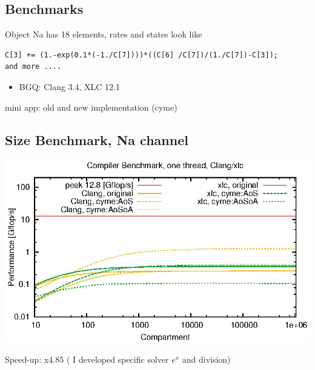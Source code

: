 \documentclass{beamer}
\begin{document}
\subsection*{Benchmarks}
\begin{frame}[fragile]
\centering
Object Na has 18 elements,  rates and states look like 
 \begin{lstlisting}[flexiblecolumns=true,basicstyle=\sffamily]     
C[3] += (1.-exp(0.1*(-1./C[7])))*((C[6] /C[7])/(1./C[7])-C[3]);
and more ....
\end{lstlisting}

\begin{itemize}
\item BGQ: Clang 3.4, XLC 12.1
\end{itemize}

mini app: old and new implementation (cyme)

\end{frame}


\subsection*{Size Benchmark, Na channel}
\begin{frame}[fragile]


\begin{center}
   \includegraphics[scale=0.8]{benchgfc.eps}
\end{center}

Speed-up: x4.85 ( I developed specific solver $e^x$ and division)
\end{frame}
\end{document}
